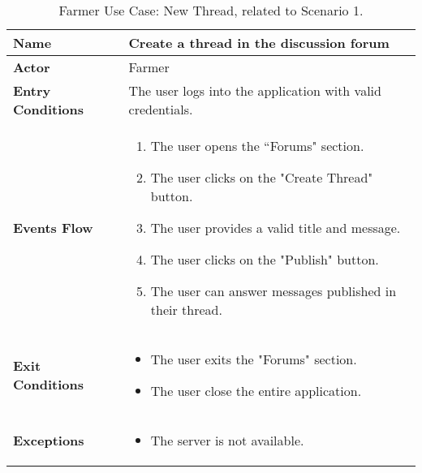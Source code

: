 \begin{table}[hbt!]
\centering
\small
\caption{\label{tab:farmerNewThread}Farmer Use Case: New Thread, related to Scenario 1.}
\renewcommand{\arraystretch}{1.25}
\begin{tabular}{|l|>{\raggedright\arraybackslash}m{12cm}|}
    \hline
    \textbf{Name} & Create a thread in the discussion forum\\
    \hline
   	\textbf{Actor} & Farmer\\
    \hline
    \textbf{Entry Conditions} & The user logs into the application with valid credentials.\\
    \hline
    \textbf{Events Flow} & 
    		\begin{enumerate}
    			\item The user opens the “Forums" section.
    			\item The user clicks on the "Create Thread" button.
    			\item The user provides a valid title and message.
    			\item The user clicks on the "Publish" button.
    			\item The user can answer messages published in their thread.
    		\end{enumerate}
    	\\
    \hline
    \textbf{Exit Conditions} & \begin{itemize}
    	\item The user exits the "Forums" section.
    	\item The user close the entire application.    
    	\end{itemize}
	\\
    \hline
    \textbf{Exceptions} & 
    		\begin{itemize}
    			\item The server is not available.
    		\end{itemize}
    	\\
    \hline
\end{tabular}
\end{table}